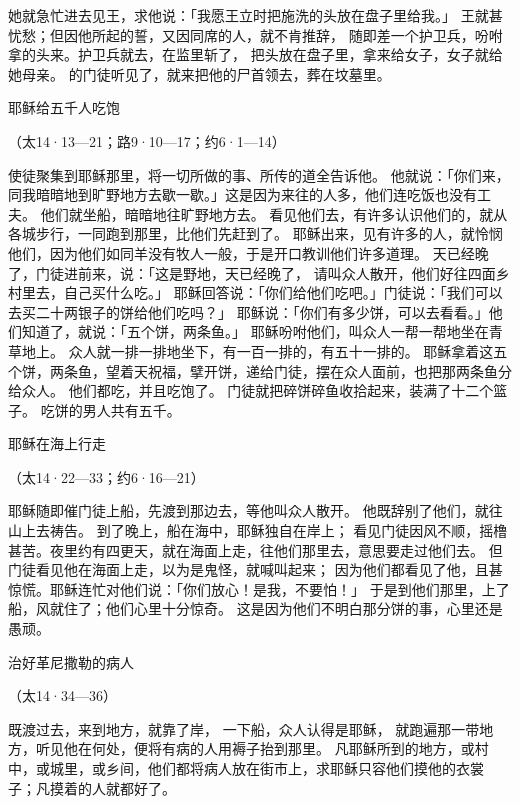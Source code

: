 {她就急忙进去见王，求他说：「我愿王立时把施洗{}的头放在盘子里给我。」
王就甚忧愁；但因他所起的誓，又因同席的人，就不肯推辞，
随即差一个护卫兵，吩咐拿{}的头来。护卫兵就去，在监里斩了{}，
把头放在盘子里，拿来给女子，女子就给她母亲。
的门徒听见了，就来把他的尸首领去，葬在坟墓里。
\par }{\SH 耶稣给五千人吃饱
\par }{\R （太14·13—21；路9·10—17；约6·1—14）
\par }{\PP {}使徒聚集到耶稣那里，将一切所做的事、所传的道全告诉他。
他就说：「你们来，同我暗暗地到旷野地方去歇一歇。」这是因为来往的人多，他们连吃饭也没有工夫。
他们就坐船，暗暗地往旷野地方去。
看见他们去，有许多认识他们的，就从各城步行，一同跑到那里，比他们先赶到了。
耶稣出来，见有许多的人，就怜悯他们，因为他们如同羊没有牧人一般，于是开口教训他们许多道理。
天已经晚了，门徒进前来，说：「这是野地，天已经晚了，
请叫众人散开，他们好往四面乡村里去，自己买什么吃。」
耶稣回答说：「你们给他们吃吧。」门徒说：「我们可以去买二十两银子的饼给他们吃吗？」
耶稣说：「你们有多少饼，可以去看看。」他们知道了，就说：「五个饼，两条鱼。」
耶稣吩咐他们，叫众人一帮一帮地坐在青草地上。
众人就一排一排地坐下，有一百一排的，有五十一排的。
耶稣拿着这五个饼，两条鱼，望着天祝福，擘开饼，递给门徒，摆在众人面前，也把那两条鱼分给众人。
他们都吃，并且吃饱了。
门徒就把碎饼碎鱼收拾起来，装满了十二个篮子。
吃饼的男人共有五千。
\par }{\SH 耶稣在海上行走
\par }{\R （太14·22—33；约6·16—21）
\par }{\PP {}耶稣随即催门徒上船，先渡到那边{}去，等他叫众人散开。
他既辞别了他们，就往山上去祷告。
到了晚上，船在海中，耶稣独自在岸上；
看见门徒因风不顺，摇橹甚苦。夜里约有四更天，就在海面上走，往他们那里去，意思要走过他们去。
但门徒看见他在海面上走，以为是鬼怪，就喊叫起来；
因为他们都看见了他，且甚惊慌。耶稣连忙对他们说：「你们放心！是我，不要怕！」
于是到他们那里，上了船，风就住了；他们心里十分惊奇。
这是因为他们不明白那分饼的事，心里还是愚顽。
\par }{\SH 治好革尼撒勒的病人
\par }{\R （太14·34—36）
\par }{\PP {}既渡过去，来到{}地方，就靠了岸，
一下船，众人认得是耶稣，
就跑遍那一带地方，听见他在何处，便将有病的人用褥子抬到那里。
凡耶稣所到的地方，或村中，或城里，或乡间，他们都将病人放在街市上，求耶稣只容他们摸他的衣裳 子；凡摸着的人就都好了。

}
